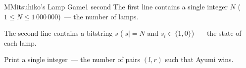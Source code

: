 \begin{problem}{M}{Mitsuhiko's Lamp Game}{1 second}
\noindent
The first line contains a single integer $N$ ($1 \le N \le 1\,000\,000$)~--- the number of lamps.

\noindent
The second line contains a bitstring $s$ ($|s| = N$ and $s_i \in \{1, 0\}$)~--- the state of each lamp.

\OutputFile

\noindent
Print a single integer~--- the number of pairs $(l, r)$ such that Ayumi wins.

\Examples

\begin{example}
\end{example}

\pagebreak

\end{problem}
